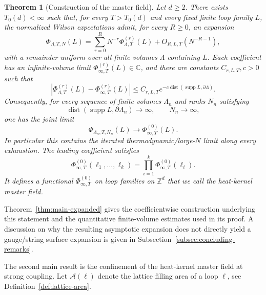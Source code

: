 \documentclass[11pt,a4paper,reqno]{amsart}
\newtheorem{theorem}{Theorem}[section]
\theoremstyle{definition}
\theoremstyle{remark}
\newcommand\Z{{\mathbb{Z}}}
\newcommand\C{{\mathbb C}}
\begin{document}
\begin{theorem}[Construction of the master field]\label{thm:main}
Let $d\ge2$. There exists $T_0(d)<\infty$ such that, for every $T>T_0(d)$ and every fixed finite loop family $L$, the normalized Wilson expectations admit, for every $R\ge0$, an expansion
\begin{equation}\label{eq:intro-full-expansion}
\Phi_{\Lambda,T,N}(L)
=\sum_{r=0}^R N^{-r}\Phi^{(r)}_{\Lambda,T}(L)+O_{R,L,T}(N^{-R-1}),
\end{equation}
with a remainder uniform over all finite volumes $\Lambda$ containing $L$. Each coefficient has an infinite-volume limit $\Phi^{(r)}_{\infty,T}(L)\in\C$, and there are constants $C_{r,L,T},c>0$ such that
\begin{equation}\label{eq:intro-exp-locality}
|\Phi^{(r)}_{\Lambda,T}(L)-\Phi^{(r)}_{\infty,T}(L)|
\le C_{r,L,T}e^{-c\operatorname{dist}(\operatorname{supp}L,\partial\Lambda)}.
\end{equation}
Consequently, for every sequence of finite volumes $\Lambda_n$ and ranks $N_n$ satisfying
\[
\operatorname{dist}(\operatorname{supp}L,\partial\Lambda_n)\longrightarrow\infty,
\qquad N_n\longrightarrow\infty,
\]
one has the joint limit
\begin{equation}\label{eq:intro-joint-limit}
\Phi_{\Lambda_n,T,N_n}(L)\longrightarrow\Phi^{(0)}_{\infty,T}(L).
\end{equation}
In particular this contains the iterated thermodynamic/large-$N$ limit along every exhaustion. The leading coefficient satisfies
\begin{equation}
\Phi^{(0)}_{\infty,T}(\ell_1,\ldots,\ell_k)=\prod_{i=1}^k\Phi^{(0)}_{\infty,T}(\ell_i).
\end{equation}
It defines a functional $\Phi^{(0)}_{\infty,T}$ on loop families on $\Z^d$ that we call the \emph{heat-kernel master field}.
\end{theorem}

Theorem~\ref{thm:main-expanded} gives the coefficientwise construction underlying this statement and the quantitative finite-volume estimates used in its proof. A discussion on why the resulting asymptotic expansion does not directly yield a gauge/string surface expansion is given in Subsection~\ref{subsec:concluding-remarks}.

The second main result is the confinement of the heat-kernel master field at strong coupling. Let $\mathcal A(\ell)$ denote the lattice filling area of a loop $\ell$, see Definition~\ref{def:lattice-area}.
\end{document}
